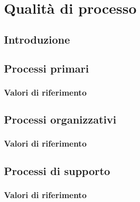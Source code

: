 \section{Qualità di processo}
\subsection{Introduzione}
\subsection{Processi primari}
\subsubsection{Valori di riferimento}
\subsection{Processi organizzativi}
\subsubsection{Valori di riferimento}
\subsection{Processi di supporto}
\subsubsection{Valori di riferimento}
